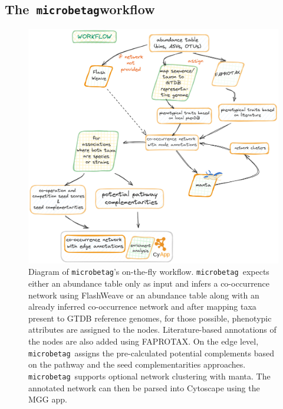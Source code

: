\documentclass[sn-mathphys,Numbered]{sn-jnl}  %
\theoremstyle{thmstyleone}%
\theoremstyle{thmstyletwo}%
\theoremstyle{thmstylethree}%
\newcommand{\microbetag}{\texttt{microbetag}}
\begin{document}
    \subsection*{The~\microbetag \space  workflow}
    \label{subsec:app}
        \begin{figure}[h!]
            \includegraphics[width=0.9\columnwidth]{figs/microbetag-wf.png}
            \caption{
                Diagram of \microbetag's on-the-fly workflow. 
                \microbetag~\space expects either an abundance table only as input and infers a co-occurrence network using FlashWeave 
                or an abundance table along with an already inferred co-occurrence network 
                and after mapping taxa present to GTDB reference genomes, for those possible, phenotypic attributes are assigned to the nodes. 
                Literature-based annotations of the nodes are also added using FAPROTAX.
                On the edge level, \microbetag~\space assigns the pre-calculated potential complements based on the pathway and the seed complementarities approaches. 
                \microbetag~\space supports optional network clustering with manta.
                The annotated network can then be parsed into Cytoscape using the MGG app.
            }
            \label{fig:wf}
        \end{figure}
\end{document}
